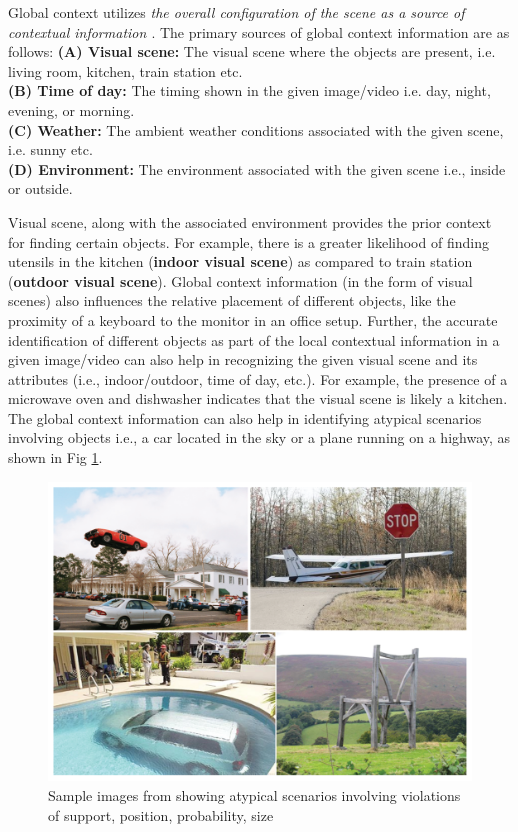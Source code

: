 Global context utilizes \textit{the overall configuration of the scene as a source of contextual information \cite{contextvision}}. The primary sources of global context information are as follows:
\textbf{(A) Visual scene:} The visual scene where the objects are present, i.e. living room, kitchen, train station etc. \\
\textbf{(B) Time of day:} The timing shown in the given image/video i.e. day, night, evening, or morning. \\
\textbf{ (C) Weather:} The ambient weather conditions associated with the given scene, i.e. sunny etc. \\
\textbf{ (D) Environment:} The environment associated with the given scene i.e., inside or outside.
\par 
Visual scene, along with the associated environment provides the prior context for finding certain objects. For example, there is a greater likelihood of finding utensils in the kitchen (\textbf{indoor visual scene}) as compared to train station (\textbf{outdoor visual scene}). Global context information (in the form of visual scenes) also influences the relative placement of different objects, like the proximity of a keyboard to the monitor in an office setup. Further, the accurate identification of different objects as part of the local contextual information in a given image/video can also help 
in recognizing the given visual scene \cite{Torralba2003ContextualPF} and its attributes (i.e., indoor/outdoor, time of day, etc.). For example, the presence of a microwave oven and dishwasher indicates that the visual scene is likely a kitchen. The global context information can also help in identifying atypical scenarios \cite{Choi2012ContextMA} involving objects i.e., a car located in the sky or a plane running on a highway, as shown in Fig \ref{outcontext}. 

\begin{figure}[h!]
    \centering
        \includegraphics[width=0.5\linewidth]{figures/out_of_context_image.png}
        \caption{Sample images from \cite{Choi2012ContextMA} showing atypical scenarios involving violations of support, position, probability, size }
        \label{outcontext}
\end{figure}
    
